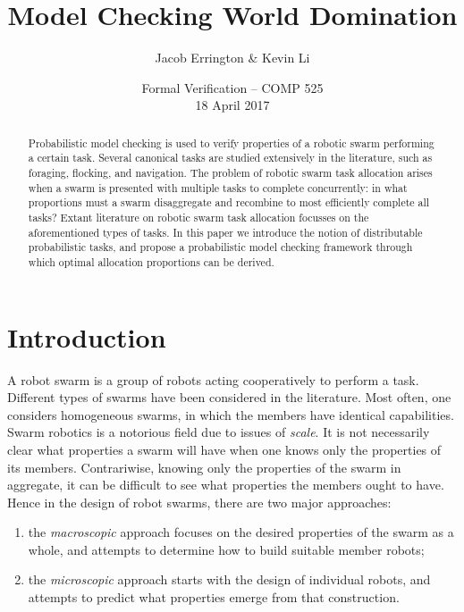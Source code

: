 \documentclass[11pt]{article}
\title{Model Checking World Domination}
\author{Jacob Errington \& Kevin Li}
\date{Formal Verification -- COMP 525\\18 April 2017}
\theoremstyle{definition}
\begin{document}
\maketitle

\begin{abstract}
    Probabilistic model checking is used to verify properties of a robotic
    swarm performing a certain task.
    Several canonical tasks are studied extensively in the literature,
    such as foraging, flocking, and navigation.
    The problem of robotic swarm task allocation arises when a swarm is
    presented with multiple tasks to complete concurrently: in what proportions
    must a swarm disaggregate and recombine to most efficiently complete all
    tasks?
    Extant literature on robotic swarm task allocation focusses on the
    aforementioned types of tasks.
    In this paper we introduce the notion of distributable probabilistic tasks,
    and propose a probabilistic model checking framework through which optimal
    allocation proportions can be derived.
\end{abstract}

\section{Introduction}
\label{sec:intro}

A robot swarm is a group of robots acting cooperatively to perform a task.
Different types of swarms have been considered in the literature.
Most often, one considers homogeneous swarms, in which the members have
identical capabilities.
Swarm robotics is a notorious field due to issues of \emph{scale}.
It is not necessarily clear what properties a swarm will have when one knows
only the properties of its members.
Contrariwise, knowing only the properties of the swarm in aggregate, it can be
difficult to see what properties the members ought to have.
Hence in the design of robot swarms, there are two major approaches:
%
\begin{enumerate}
    \item
        the \emph{macroscopic} approach focuses on the desired properties of
        the swarm as a whole, and attempts to determine how to build suitable
        member robots; \cite{brambilla12}
    \item
        the \emph{microscopic} approach starts with the design of individual
        robots, and attempts to predict what properties emerge from that
        construction. \cite{brambilla12}
\end{enumerate}
\end{document}
